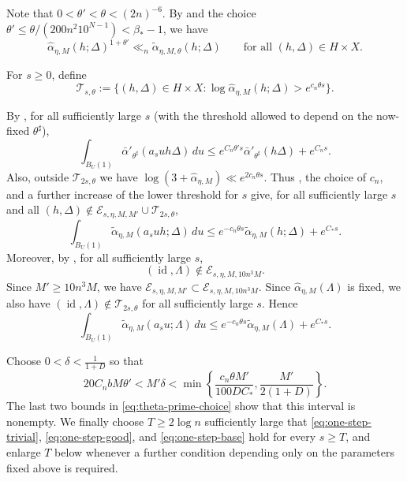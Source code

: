 \documentclass[reqno,11pt]{amsart}
\numberwithin{equation}{section}
\theoremstyle{definition}
\theoremstyle{remark}
\newcommand{\op}{\operatorname}
\newcommand{\id}{\op{id}}
\begin{document}
Note that $0<\theta'<\theta<(2n)^{-6}$. By
 and the choice
$\theta'\le\theta/(200n^2 10^{N-1})<\beta_*-1$, we have
\begin{equation}\label{eq:hatalpha-majorized}
\widehat\alpha_{\eta,M}(h;\Delta)^{1+\theta'}
\ll_n \widetilde\alpha_{\eta,M,\theta}(h;\Delta)
\qquad
\text{for all } (h,\Delta)\in H\times X.
\end{equation}

For $s\ge0$, define
$$
\mathcal{T}_{s,\theta}:=
\{(h,\Delta)\in H\times X:
\log \widehat{\alpha}_{\eta,M}(h;\Delta)>e^{c_n\theta s}\}.
$$

By , for all sufficiently
large $s$ (with the threshold allowed to depend on the now-fixed
$\theta^{\sharp}$),
\begin{equation}\label{eq:one-step-trivial}
\int_{B_{U}(1)}
\bar{\alpha}'_{\theta^{\sharp}}(a_suh\Delta)\,du
\le
 e^{C_n\theta's}\bar{\alpha}'_{\theta^{\sharp}}(h\Delta)
+
 e^{C_ns}.
\end{equation}
Also, outside $\mathcal T_{2s,\theta}$ we have
$\log(3+\widehat\alpha_{\eta,M})\ll
e^{2c_n\theta s}$. Thus , the choice of
$c_n$, and a further increase of the lower threshold for $s$ give, for
all sufficiently large $s$ and all
$(h,\Delta)\notin \mathcal E_{s,\eta,M,M'}\cup \mathcal{T}_{2s,\theta}$,
\begin{equation}\label{eq:one-step-good}
\int_{B_{U}(1)}
\widetilde\alpha_{\eta,M}(a_suh;\Delta)\,du
\le
e^{-c_n\theta s}\widetilde\alpha_{\eta,M}(h;\Delta)
+
e^{C_*s}.
\end{equation}
Moreover, by , for all sufficiently large
$s$,
$$
(\id,\Lambda)\notin \mathcal E_{s,\eta,M,10n^3M}.
$$
Since $M'\ge10n^3M$, we have
$\mathcal E_{s,\eta,M,M'}\subset\mathcal E_{s,\eta,M,10n^3M}$.
Since $\widehat\alpha_{\eta,M}(\Lambda)$ is fixed, we also have
$(\id,\Lambda)\notin\mathcal T_{2s,\theta}$ for all sufficiently large
$s$. Hence
\begin{equation}\label{eq:one-step-base}
\int_{B_{U}(1)}
\widetilde\alpha_{\eta,M}(a_su;\Lambda)\,du
\le
e^{-c_n\theta s}\widetilde\alpha_{\eta,M}(\Lambda)
+
e^{C_*s}.
\end{equation}

Choose $0<\delta<\frac1{1+D}$ so that
\begin{equation}\label{eq:deltarange}
20C_nbM\theta'<M'\delta
<
\min\left\{
\frac{c_n\theta M'}{100DC_*},\frac{M'}{2(1+D)}
\right\}.
\end{equation}
The last two bounds in \eqref{eq:theta-prime-choice} show that this interval is nonempty. We finally choose $T\ge 2\log n$ sufficiently
large that \eqref{eq:one-step-trivial}, \eqref{eq:one-step-good}, and
\eqref{eq:one-step-base} hold for every $s\ge T$, and enlarge $T$ below
whenever a further condition depending only on the parameters fixed above
is required.
\medskip
\end{document}
